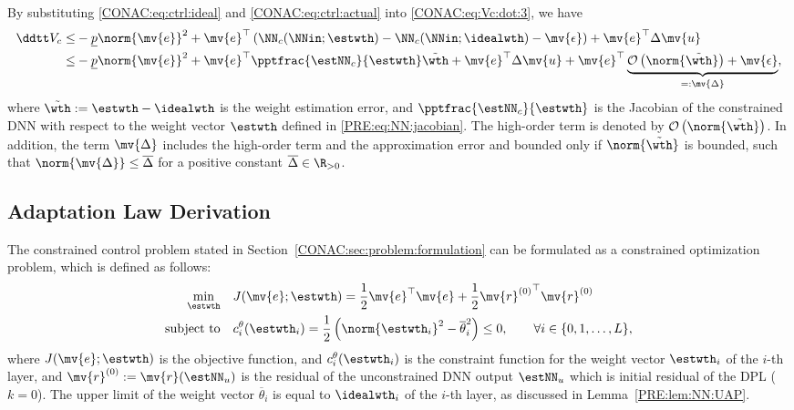 By substituting \eqref{CONAC:eq:ctrl:ideal} and \eqref{CONAC:eq:ctrl:actual} into \eqref{CONAC:eq:Vc:dot:3}, we have
\begin{align} \label{CONAC:eq:Vc:dot:4}
  \ddtt V_c
  \le &
  -\underline{p}\norm{\mv{e}}^2
  +
  \mv{e}^\top
  \left(
    \NN_c(\NNin;\estwth)
    -
    \NN_c(\NNin;\idealwth)
    -
    \mv{\epsilon}
  \right)
  +
  \mv{e}^\top
  \Delta\mv{u}
  \\ \nonumber
  \le &
  -\underline{p}\norm{\mv{e}}^2
  +
  \mv{e}^\top
  \pptfrac{\estNN_c}{\estwth}\tilde{\wth}
  +
  \mv{e}^\top
  \Delta\mv{u}
  +
  \mv{e}^\top
  \underbrace{
  \mathcal{O}\left(\norm{\tilde\wth}\right)
  +
  \mv{\epsilon}
  }_{=:\mv{\Delta}}
  ,
\end{align}
where $\tilde{\wth}:=\estwth-\idealwth$ is the weight estimation error, and $\pptfrac{\estNN_c}{\estwth}$ is the Jacobian of the constrained DNN with respect to the weight vector $\estwth$ defined in \eqref{PRE:eq:NN:jacobian}.
The high-order term is denoted by $\mathcal{O}\left(\norm{\tilde\wth}\right)$.
In addition, the term $\mv{\Delta}$ includes the high-order term and the approximation error and bounded only if $\norm{\tilde\wth}$ is bounded, such that $\norm{\mv{\Delta}}\le\overline{\Delta}$ for a positive constant $\overline{\Delta}\in\R_{>0}$.

\subsection{Adaptation Law Derivation}

The constrained control problem stated in Section~\ref{CONAC:sec:problem:formulation} can be formulated as a constrained optimization problem, which is defined as follows:
\begin{subequations} 
  \label{CONAC:eq:opt:prob} 
  \begin{align} 
    \min_{\estwth} \quad 
    & 
    J(\mv{e};\estwth)
    = 
    \frac{1}{2} \mv{e}^\top \mv{e} 
    +
    \frac{1}{2} {\mv{r}^{(0)}}^\top \mv{r}^{(0)}
    \label{CONAC:eq:opt:prob:obj} 
    \\ 
    \text{subject to} \quad  
    & 
    c^{\theta}_i(\estwth_i)=\frac{1}{2}
    \left(
      \norm{\estwth_i}^2
      -
      \overline{\theta}_i^2 
    \right)
    \le 0, 
    \qquad
    \forall i\in\{0,1,\ldots,L\}
    ,
    \label{CONAC:eq:opt:prob:const1} 
  \end{align}%
\end{subequations}
where $J(\mv{e};\estwth)$ is the objective function, and $c^{\theta}_i(\estwth_i)$ is the constraint function for the weight vector $\estwth_i$ of the $i$-th layer, and $\mv{r}^{(0)}:=\mv{r}(\estNN_u)$ is the residual of the unconstrained DNN output $\estNN_u$ which is initial residual of the DPL ($k=0$).
The upper limit of the weight vector $\overline{\theta}_i$ is equal to $\idealwth_i$ of the $i$-th layer, as discussed in Lemma~\ref{PRE:lem:NN:UAP}.

